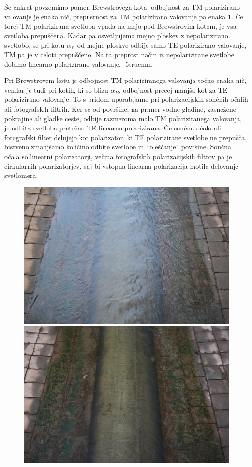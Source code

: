 Še enkrat povzemimo pomen Brewstrovega kota: odbojnost za TM polarizirano
valovanje je enaka nič, prepustnost za TM polarizirano valovanje pa enaka 1. Če 
torej TM polarizirana svetloba vpada na mejo pod Brewstrovim kotom, je vsa svetloba
prepuščena. Kadar pa osvetljujemo mejno ploskev z nepolarizirano svetlobo, se 
pri kotu $\alpha_B$ od mejne ploskve odbije samo TE polarizirano
valovanje, TM pa je v celoti prepuščeno. Na ta preprost način
iz nepolarizirane svetlobe dobimo linearno polarizirano valovanje.
\vglue-5truemm
\begin{remark}
Pri Brewstrovem kotu je odbojnost TM polariziranega valovanja točno 
enaka nič, vendar je tudi pri kotih, ki so blizu $\alpha_B$, 
odbojnost precej manjša kot za TE polarizirano valovanje. 
To s pridom uporabljamo pri polarizacijskih sončnih očalih ali fotografskih
filtrih. Ker se od površine, na primer vodne gladine, zasnežene pokrajine
ali gladke ceste, odbije razmeroma malo TM polariziranega valovanja, 
je odbita svetloba pretežno TE linearno polarizirana. Če sončna
očala ali fotografski filter delujejo kot polarizator, ki TE polarizirane 
svetlobe ne prepušča, bistveno zmanjšamo količino odbite svetlobe in 
``bleščanje'' površine. Sončna očala so linearni polarizatorji, večina 
fotografskih polarizacijskih filtrov pa je cirkularnih polarizatorjev,
saj bi vstopna linearna polarizacija motila delovanje svetlomera.
\begin{figure}[ht]
\centering
\includegraphics[width=7truecm]{slike/04_photos_voda1.jpg}\hfill
\includegraphics[width=7truecm]{slike/04_photos_voda2.jpg}

\end{figure}
\end{remark}
